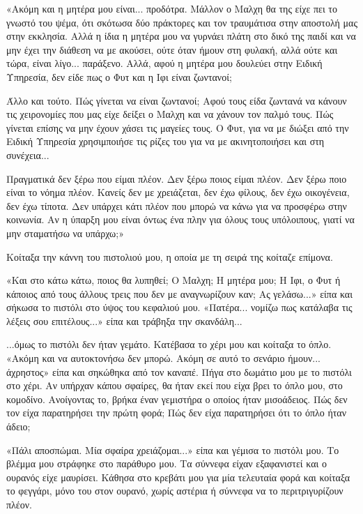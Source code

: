 \documentclass[12pt,twoside, openany]{book}
\begin{document}
«Ακόμη και η μητέρα μου είναι... προδότρα. Μάλλον ο Μαλχη θα της είχε πει το γνωστό του ψέμα, ότι σκότωσα δύο πράκτορες και τον τραυμάτισα στην αποστολή μας στην εκκλησία. Αλλά η ίδια η μητέρα μου να γυρνάει πλάτη στο δικό της παιδί και να μην έχει την διάθεση να με ακούσει, ούτε όταν ήμουν στη φυλακή, αλλά ούτε και τώρα, είναι λίγο... παράξενο. Αλλά, αφού η μητέρα μου δουλεύει στην Ειδική Υπηρεσία, δεν είδε πως ο Φυτ και η Ιφι είναι ζωντανοί;

Άλλο και τούτο. Πώς γίνεται να είναι ζωντανοί; Αφού τους είδα ζωντανά να κάνουν τις χειρονομίες που μας είχε δείξει ο Μαλχη και να χάνουν τον παλμό τους. Πώς γίνεται επίσης να μην έχουν χάσει τις μαγείες τους. Ο Φυτ, για να με διώξει από την Ειδική Υπηρεσία χρησιμποιήσε τις ρίζες του για να με ακινητοποιήσει και στη συνέχεια... 

Πραγματικά δεν ξέρω που είμαι πλέον. Δεν ξέρω ποιος είμαι πλέον. Δεν ξέρω ποιο είναι το νόημα πλέον. Κανείς δεν με χρειάζεται, δεν έχω φίλους, δεν έχω οικογένεια, δεν έχω τίποτα. Δεν υπάρχει κάτι πλέον που μπορώ να κάνω για να προσφέρω στην κοινωνία. Αν η ύπαρξη μου είναι όντως ένα πλην για όλους τους υπόλοιπους, γιατί να μην σταματήσω να υπάρχω;»

Κοίταξα την κάννη του πιστολιού μου, η οποία με τη σειρά της κοίταζε επίμονα.

«Και στο κάτω κάτω, ποιος θα λυπηθεί; Ο Μαλχη; Η μητέρα μου; Η Ιφι, ο Φυτ ή κάποιος από τους άλλους τρεις που δεν με αναγνωρίζουν καν; Ας γελάσω...» είπα και σήκωσα το πιστόλι στο ύψος του κεφαλιού μου. «Πατέρα... νομίζω πως κατάλαβα τις λέξεις σου επιτέλους...» είπα και τράβηξα την σκανδάλη...\newpage\newpage

...όμως το πιστόλι δεν ήταν γεμάτο. Κατέβασα το χέρι μου και κοίταξα το όπλο. «Ακόμη και να αυτοκτονήσω δεν μπορώ. Ακόμη σε αυτό το σενάριο ήμουν... άχρηστος» είπα και σηκώθηκα από τον καναπέ. Πήγα στο δωμάτιο μου με το πιστόλι στο χέρι. Αν υπήρχαν κάπου σφαίρες, θα ήταν εκεί που είχα βρει το όπλο μου, στο κομοδίνο. Ανοίγοντας το, βρήκα έναν γεμιστήρα ο οποίος ήταν μισοάδειος. Πώς δεν τον είχα παρατηρήσει την πρώτη φορά; Πώς δεν είχα παρατηρήσει ότι το όπλο ήταν άδειο; 

«Πάλι αποσπώμαι. Μία σφαίρα χρειάζομαι...» είπα και γέμισα το πιστόλι μου. Το βλέμμα μου στράφηκε στο παράθυρο μου. Τα σύννεφα είχαν εξαφανιστεί και ο ουρανός είχε μαυρίσει. Κάθησα στο κρεβάτι μου για μία τελευταία φορά και κοίταξα το φεγγάρι, μόνο του στον ουρανό, χωρίς αστέρια ή σύννεφα να το περιτριγυρίζουν πλέον. 
\end{document}
